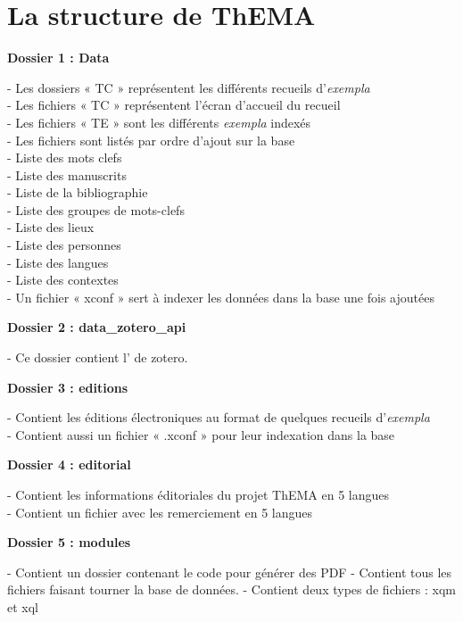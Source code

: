 
	\section{La structure de ThEMA}
\textbf{Dossier 1 : Data} 
\begin{flushleft}
	- Les dossiers « TC » représentent les différents recueils d'\textit{exempla} \\ 
	- Les fichiers « TC » représentent l'écran d'accueil du recueil \\
	- Les fichiers « TE » sont les différents \textit{exempla} indexés \\
	- Les fichiers sont listés par ordre d'ajout sur la base \\
	- Liste des mots clefs \\
	- Liste des manuscrits \\
	- Liste de la bibliographie \\
	- Liste des groupes de mots-clefs \\
	- Liste des lieux \\
	- Liste des personnes \\
	- Liste des langues \\
	- Liste des contextes \\
	- Un fichier « xconf » sert à indexer les données dans la base une fois ajoutées \\
\end{flushleft}

\textbf{Dossier 2 : data\_zotero\_api} 
\begin{flushleft}
- Ce dossier contient l' de zotero.
\end{flushleft}
	
\textbf{Dossier  3 : editions} 
\begin{flushleft}	
	- Contient les éditions électroniques au format  de quelques recueils d'\textit{exempla} \\
	- Contient aussi un fichier « .xconf » pour leur indexation dans la base \\
\end{flushleft}	
	
\textbf{Dossier  4 : editorial} 
\begin{flushleft}	
	- Contient les informations éditoriales du projet ThEMA en 5 langues \\
	- Contient un fichier avec les remerciement en 5 langues \\
\end{flushleft}		
	
\textbf{Dossier 5 : modules}
\begin{flushleft}	
	- Contient un dossier contenant le code pour générer des PDF 
	- Contient tous les fichiers faisant tourner la base de données.
	- Contient deux types de fichiers : xqm et xql
\end{flushleft}	

